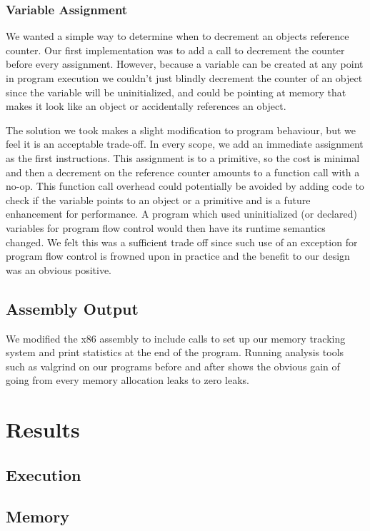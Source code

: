 \documentclass{sigplanconf}
\begin{document}
\subsubsection{Variable Assignment}
We wanted a simple way to determine when to decrement an objects reference counter.  Our first implementation was to add a call to decrement the counter before every assignment.  However, because a variable can be created at any point in program execution we couldn't just blindly decrement the counter of an object since the variable will be uninitialized, and could be pointing at memory that makes it look like an object or accidentally references an object.
\par
The solution we took makes a slight modification to program behaviour, but we feel it is an acceptable trade-off.  In every scope, we add an immediate assignment as the first instructions.  This assignment is to a primitive, so the cost is minimal and then a decrement on the reference counter amounts to a function call with a no-op.  This function call overhead could potentially be avoided by adding code to check if the variable points to an object or a primitive and is a future enhancement for performance.  A program which used uninitialized (or declared) variables for program flow control would then have its runtime semantics changed.  We felt this was a sufficient trade off since such use of an exception for program flow control is frowned upon in practice and the benefit to our design was an obvious positive.
\par

\subsection{Assembly Output}
We modified the x86 assembly to include calls to set up our memory tracking system and print statistics at the end of the program.  Running analysis tools such as valgrind on our programs before and after shows the obvious gain of going from every memory allocation leaks to zero leaks.
\section{Results}
\subsection{Execution}
\subsection{Memory}
\end{document}
